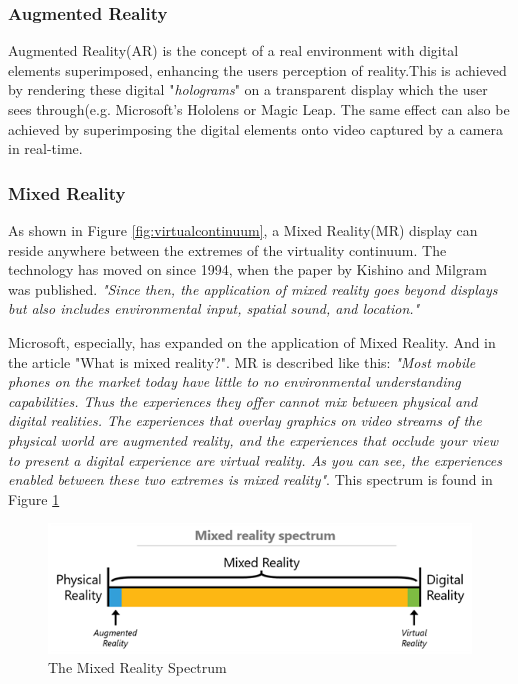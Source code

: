     \subsubsection{Augmented Reality}
    Augmented Reality(AR) is the concept of a real environment with digital elements superimposed, enhancing the users perception of reality.This is achieved by rendering these digital "\emph{holograms}" on a transparent display which the user sees through(e.g. Microsoft's Hololens or Magic Leap. The same effect can also be achieved by superimposing the digital elements onto video captured by a camera in real-time.
    
    \subsubsection{Mixed Reality}
    As shown in Figure \ref{fig:virtualcontinuum}, a Mixed Reality(MR) display can reside anywhere between the extremes of the virtuality continuum\cite{Milgram1994}. The technology has moved on since 1994, when the paper by Kishino and Milgram was published. \emph{"Since then, the application of mixed reality goes beyond displays but also includes environmental input, spatial sound, and location."}\cite{wdc-mr}
    
    Microsoft, especially, has expanded on the application of Mixed Reality. And in the article "What is mixed reality?"\cite{wdc-mr}. MR is described like this: \emph{"Most mobile phones on the market today have little to no environmental understanding capabilities. Thus the experiences they offer cannot mix between physical and digital realities. The experiences that overlay graphics on video streams of the physical world are augmented reality, and the experiences that occlude your view to present a digital experience are virtual reality. As you can see, the experiences enabled between these two extremes is mixed reality"}\cite{wdc-mr}. This spectrum is found in Figure \ref{fig:mrspectrum}
    
    \begin{figure}[!ht]
        \centering
        \includegraphics[scale=1]{figures/mixedrealityspectrum.png}
        \caption{The Mixed Reality Spectrum\cite{wdc-mr}}
        \label{fig:mrspectrum}
    \end{figure}
    

